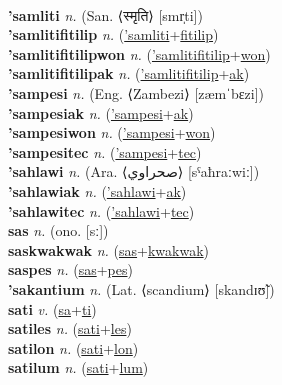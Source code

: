  \label{'samoatilip} \\
\textbf{'samliti} \textit{n.} (San. ⟨स्मृति⟩ [smr̩ti])
 \label{'samliti} \\
\textbf{'samlitifitilip} \textit{n.} (\hyperref['samliti]{'samliti}+\hyperref[fitilip]{fitilip})
 \label{'samlitifitilip} \\
\textbf{'samlitifitilipwon} \textit{n.} (\hyperref['samlitifitilip]{'samlitifitilip}+\hyperref[won]{won})
 \label{'samlitifitilipwon} \\
\textbf{'samlitifitilipak} \textit{n.} (\hyperref['samlitifitilip]{'samlitifitilip}+\hyperref[ak]{ak})
 \label{'samlitifitilipak} \\
\textbf{'sampesi} \textit{n.} (Eng. ⟨Zambezi⟩ [zæmˈbɛzi])
 \label{'sampesi} \\
\textbf{'sampesiak} \textit{n.} (\hyperref['sampesi]{'sampesi}+\hyperref[ak]{ak})
 \label{'sampesiak} \\
\textbf{'sampesiwon} \textit{n.} (\hyperref['sampesi]{'sampesi}+\hyperref[won]{won})
 \label{'sampesiwon} \\
\textbf{'sampesitec} \textit{n.} (\hyperref['sampesi]{'sampesi}+\hyperref[tec]{tec})
 \label{'sampesitec} \\
\textbf{'sahlawi} \textit{n.} (Ara. ⟨صحراوي⟩ [sˤaħraːwiː])
 \label{'sahlawi} \\
\textbf{'sahlawiak} \textit{n.} (\hyperref['sahlawi]{'sahlawi}+\hyperref[ak]{ak})
 \label{'sahlawiak} \\
\textbf{'sahlawitec} \textit{n.} (\hyperref['sahlawi]{'sahlawi}+\hyperref[tec]{tec})
 \label{'sahlawitec} \\
\textbf{sas} \textit{n.} (ono. [sː])
 \label{sas} \\
\textbf{saskwakwak} \textit{n.} (\hyperref[sas]{sas}+\hyperref[kwakwak]{kwakwak})
 \label{saskwakwak} \\
\textbf{saspes} \textit{n.} (\hyperref[sas]{sas}+\hyperref[pes]{pes})
 \label{saspes} \\
\textbf{'sakantium} \textit{n.} (Lat. ⟨scandium⟩ [skandɪʊ̃])
 \label{'sakantium} \\
\textbf{sati} \textit{v.} (\hyperref[sa]{sa}+\hyperref[ti]{ti})
 \label{sati} \\
\textbf{satiles} \textit{n.} (\hyperref[sati]{sati}+\hyperref[les]{les})
 \label{satiles} \\
\textbf{satilon} \textit{n.} (\hyperref[sati]{sati}+\hyperref[lon]{lon})
 \label{satilon} \\
\textbf{satilum} \textit{n.} (\hyperref[sati]{sati}+\hyperref[lum]{lum})
